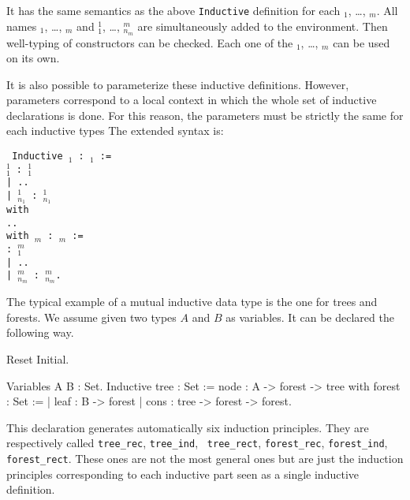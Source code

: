 \noindent It has the same semantics as the above {\tt Inductive}
definition for each \ident$_1$, {\ldots}, \ident$_m$. All names
\ident$_1$, {\ldots}, \ident$_m$ and \ident$_1^1$, \dots,
\ident$_{n_m}^m$ are simultaneously added to the environment. Then
well-typing of constructors can be checked. Each one of the
\ident$_1$, {\ldots}, \ident$_m$ can be used on its own.

It is also possible to parameterize these inductive definitions.
However, parameters correspond to a local
context in which the whole set of inductive declarations is done.  For
this reason, the parameters must be strictly the same for each
inductive types The extended syntax is:

\medskip
{\tt 
Inductive {{\ident$_1$} {\params} : {\type$_1$} :=  \\
\mbox{}\hspace{0.4cm}  {\ident$_1^1$} : {\type$_1^1$} \\
\mbox{}\hspace{0.1cm}| ..  \\
\mbox{}\hspace{0.1cm}| {\ident$_{n_1}^1$} : {\type$_{n_1}^1$}  \\
with\\
\mbox{}\hspace{0.1cm} .. \\
with {\ident$_m$} {\params} : {\type$_m$} := \\
\mbox{}\hspace{0.4cm}{\ident$_1^m$} : {\type$_1^m$} \\
\mbox{}\hspace{0.1cm}| .. \\
\mbox{}\hspace{0.1cm}| {\ident$_{n_m}^m$} : {\type$_{n_m}^m$}.
}}
\medskip

\Example
The typical example of a mutual inductive data type is the one for
trees and forests. We assume given two types $A$ and $B$ as variables.
It can be declared the following way.

\begin{coq_eval}
Reset Initial.
\end{coq_eval}
\begin{coq_example*}
Variables A B : Set.
Inductive tree : Set :=
    node : A -> forest -> tree
with forest : Set :=
  | leaf : B -> forest
  | cons : tree -> forest -> forest.
\end{coq_example*}

This declaration generates automatically six induction
principles. They are respectively 
called {\tt tree\_rec}, {\tt tree\_ind}, {\tt
  tree\_rect}, {\tt forest\_rec}, {\tt forest\_ind}, {\tt
  forest\_rect}.  These ones are not the most general ones but are
just the induction principles corresponding to each inductive part
seen as a single inductive definition.

